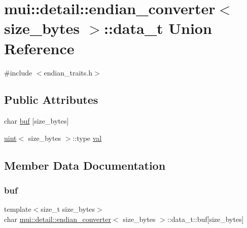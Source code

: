 \hypertarget{unionmui_1_1detail_1_1endian__converter_1_1data__t}{}\section{mui\+:\+:detail\+:\+:endian\+\_\+converter$<$ size\+\_\+bytes $>$\+:\+:data\+\_\+t Union Reference}
\label{unionmui_1_1detail_1_1endian__converter_1_1data__t}


{\ttfamily \#include $<$endian\+\_\+traits.\+h$>$}

\subsection*{Public Attributes}
\begin{DoxyCompactItemize}
\item 
char \hyperlink{unionmui_1_1detail_1_1endian__converter_1_1data__t_a2d3bae8b5e2deebe720672203e92326f}{buf} \mbox{[}size\+\_\+bytes\mbox{]}
\item 
\hyperlink{structmui_1_1detail_1_1uint}{uint}$<$ size\+\_\+bytes $>$\+::type \hyperlink{unionmui_1_1detail_1_1endian__converter_1_1data__t_a417cac59882efbad398883100aa83b42}{val}
\end{DoxyCompactItemize}


\subsection{Member Data Documentation}
\mbox{\label{unionmui_1_1detail_1_1endian__converter_1_1data__t_a2d3bae8b5e2deebe720672203e92326f}} 
\subsubsection{\texorpdfstring{buf}{buf}}
{\footnotesize\ttfamily template$<$size\+\_\+t size\+\_\+bytes$>$ \\
char \hyperlink{structmui_1_1detail_1_1endian__converter}{mui\+::detail\+::endian\+\_\+converter}$<$ size\+\_\+bytes $>$\+::data\+\_\+t\+::buf\mbox{[}size\+\_\+bytes\mbox{]}}

